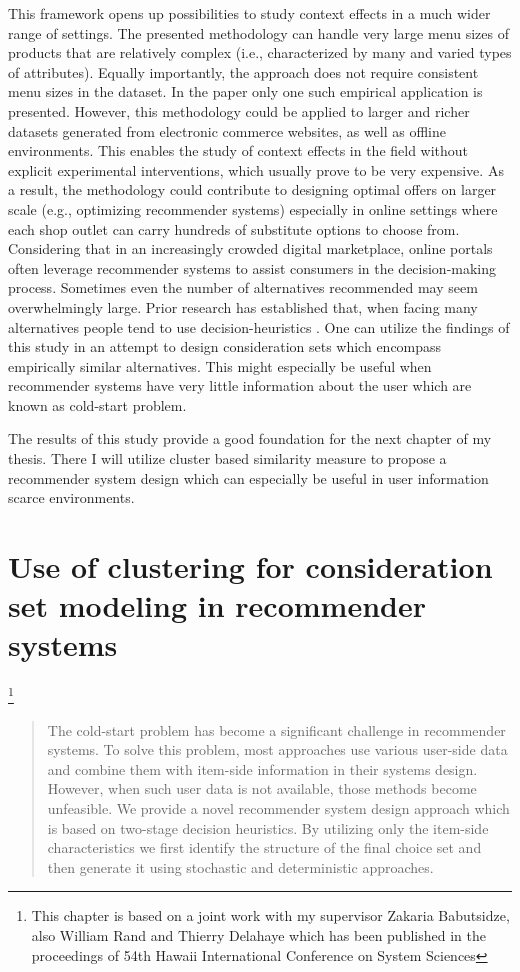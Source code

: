 \documentclass[a4paper,12pt]{article}
\begin{document}
This framework opens up possibilities to study context effects in a much wider range of settings. The presented methodology can handle very large menu sizes of products that are relatively complex (i.e., characterized by many and varied types of attributes). Equally importantly, the approach does not require consistent menu sizes in the dataset. In the paper only one such empirical application is presented. However, this methodology could be applied to larger and richer datasets generated from electronic commerce websites, as well as offline environments. This enables the study of context effects in the field without explicit experimental interventions, which usually prove to be very expensive. As a result, the methodology could contribute to designing optimal offers on larger scale (e.g., optimizing recommender systems) especially in online settings where each shop outlet can carry hundreds of substitute options to choose from. Considering that in an increasingly crowded digital marketplace, online portals often leverage recommender systems to assist consumers in the decision-making process. Sometimes even the number of alternatives recommended may seem overwhelmingly large. Prior research has established that, when facing many alternatives people tend to use decision-heuristics \citep{fishburn1974exceptional}. One can utilize the findings of this study in an attempt to design consideration sets which encompass empirically similar alternatives. This might especially be useful when recommender systems have very little information about the user which are known as cold-start problem. 

The results of this study provide a good foundation for the next chapter of my thesis. There I will utilize cluster based similarity measure to propose a recommender system design which can especially be useful in user information scarce environments.




\newpage
\section{Use of clustering for consideration set modeling in recommender systems}\footnote{This chapter is based on a joint work with my supervisor Zakaria Babutsidze, also William Rand and Thierry Delahaye which has been published in the proceedings of 54th Hawaii International Conference on System Sciences}\label{chapter:hicssPaper}

\begin{abstract}
        The cold-start problem has become a significant challenge in recommender systems. To solve this problem, most approaches use various user-side data  and combine them with item-side information in their systems design. However, when such user data is not available, those methods become unfeasible. We provide a novel recommender system design approach which is based on two-stage decision heuristics. By utilizing only the item-side characteristics we first identify the structure of the final choice set and then generate it using stochastic and deterministic approaches.
        
\end{abstract}
\end{document}
